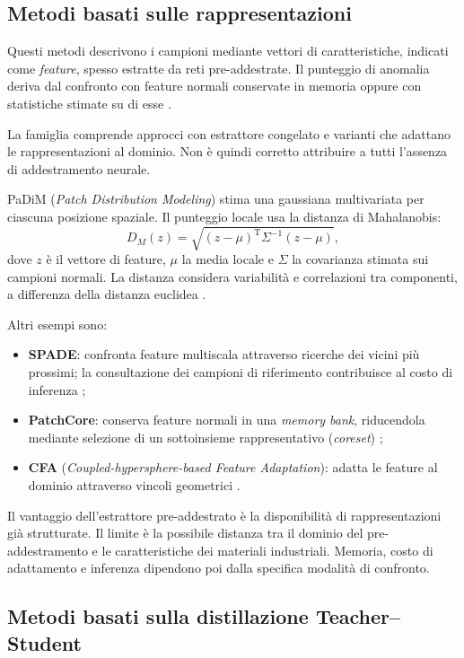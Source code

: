 \subsection{Metodi basati sulle rappresentazioni}

Questi metodi descrivono i campioni mediante vettori di caratteristiche, indicati come \textit{feature}, spesso estratte da reti pre-addestrate. Il punteggio di anomalia deriva dal confronto con feature normali conservate in memoria oppure con statistiche stimate su di esse \cite{Cui_et_al._2023}.

La famiglia comprende approcci con estrattore congelato e varianti che adattano le rappresentazioni al dominio. Non è quindi corretto attribuire a tutti l'assenza di addestramento neurale.

PaDiM (\textit{Patch Distribution Modeling}) stima una gaussiana multivariata per ciascuna posizione spaziale. Il punteggio locale usa la distanza di Mahalanobis:
\[
    D_M(z)=\sqrt{(z-\mu)^{\mathrm{T}}\Sigma^{-1}(z-\mu)},
\]
dove $z$ è il vettore di feature, $\mu$ la media locale e $\Sigma$ la covarianza stimata sui campioni normali. La distanza considera variabilità e correlazioni tra componenti, a differenza della distanza euclidea \cite{Defard_et_al._2021}.

Altri esempi sono:
\begin{itemize}
    \item \textbf{SPADE}: confronta feature multiscala attraverso ricerche dei vicini più prossimi; la consultazione dei campioni di riferimento contribuisce al costo di inferenza \cite{Yang_et_al._2021};
    \item \textbf{PatchCore}: conserva feature normali in una \textit{memory bank}, riducendola mediante selezione di un sottoinsieme rappresentativo (\textit{coreset}) \cite{Roth_et_al._2022};
    \item \textbf{CFA} (\textit{Coupled-hypersphere-based Feature Adaptation}): adatta le feature al dominio attraverso vincoli geometrici \cite{Cui_et_al._2023}.
\end{itemize}

Il vantaggio dell'estrattore pre-addestrato è la disponibilità di rappresentazioni già strutturate. Il limite è la possibile distanza tra il dominio del pre-addestramento e le caratteristiche dei materiali industriali. Memoria, costo di adattamento e inferenza dipendono poi dalla specifica modalità di confronto.

\subsection{Metodi basati sulla distillazione Teacher--Student}

